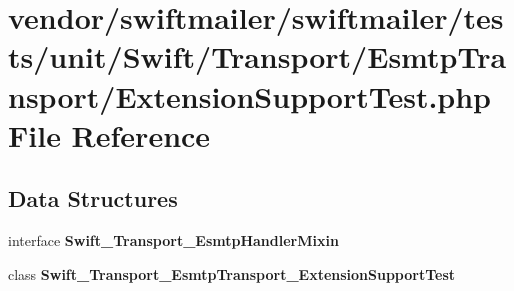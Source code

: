 \section{vendor/swiftmailer/swiftmailer/tests/unit/\+Swift/\+Transport/\+Esmtp\+Transport/\+Extension\+Support\+Test.php File Reference}
\label{_extension_support_test_8php}
\subsection*{Data Structures}
\begin{DoxyCompactItemize}
\item 
interface {\bf Swift\+\_\+\+Transport\+\_\+\+Esmtp\+Handler\+Mixin}
\item 
class {\bf Swift\+\_\+\+Transport\+\_\+\+Esmtp\+Transport\+\_\+\+Extension\+Support\+Test}
\end{DoxyCompactItemize}
